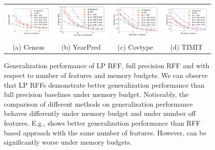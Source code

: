 \begin{figure}
\begin{tabular}{c@{\hskip 0in}c@{\hskip 0in}c@{\hskip 0in}c}
		\includegraphics[width=0.3\linewidth]{figures/census_MSE_vs_n_feat_all_line.pdf} &
		\includegraphics[width=0.3\linewidth]{figures/yearpred_MSE_vs_n_feat_all_line.pdf} &
		\includegraphics[width=0.3\linewidth]{figures/covtype_error_vs_n_feat_all_line.pdf} &
		\includegraphics[width=0.3\linewidth]{figures/timit_error_vs_n_feat_all_line.pdf} \\
		(a) Census & (b) YearPred & (c) Covtype & (d) TIMIT \\
	\end{tabular}
	\caption{Generalization performance of LP RFF, full precision RFF and \Nystrom with respect to number of features and memory budgets. We can observe that LP RFFs demonstrate better generalization performance than full precision baselines under memory budget. Noticeably, the comparison of different methods on generalization performance behaves differently under memory budget and under number off features. E.g., \Nystrom shows better generalization performance than RFF based approach with the same number of features. However, \Nystrom can be significantly worse under memory budgets.}
	\label{fig:generalization_col_app}
\end{figure}


